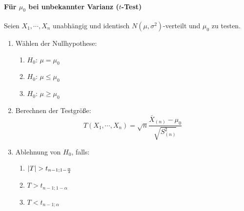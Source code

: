 		\paragraph{Für \(\mu_0\) bei unbekannter Varianz (\(t\)-Test)}
			Seien \( X_1, \cdots, X_n \) unabhängig und identisch \( N(\mu, \sigma^2) \)-verteilt und \(\mu_0\) zu testen.
			\begin{enumerate}
				\item Wählen der Nullhypothese:
					\begin{enumerate}[label = \Alph*)]
						\item \( H_0 \): \quad \( \mu = \mu_0 \)
						\item \( H_0 \): \quad \( \mu \leq \mu_0 \)
						\item \( H_0 \): \quad \( \mu \geq \mu_0 \)
					\end{enumerate}
				\item Berechnen der Testgröße:
					\begin{equation*}
						T(X_1, \cdots, X_n) = \sqrt{n} \frac{\bar{X}_{(n)} - \mu_0}{\sqrt{S_{(n)}^2}}
					\end{equation*}
				\item Ablehnung von \(H_0\), falls:
					\begin{enumerate}[label = \Alph*)]
						\item \( \abs{T} > t_{n - 1; 1 - \frac{\alpha}{2}} \)
						\item \( T > t_{n - 1; 1 - \alpha} \)
						\item \( T < t_{n - 1; \alpha} \)
					\end{enumerate}
			\end{enumerate}

